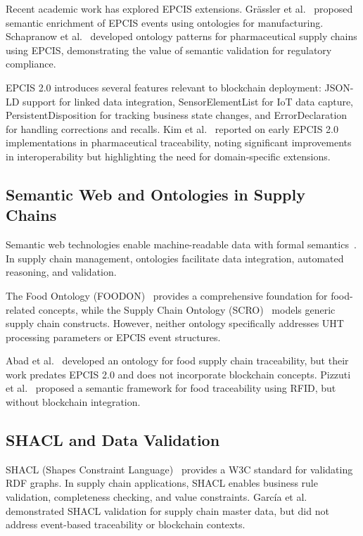 \documentclass[preprint,review,12pt,authoryear]{elsarticle}
\begin{document}
Recent academic work has explored EPCIS extensions. Gr\"assler et al.~\cite{grassler2021semantic} proposed semantic enrichment of EPCIS events using ontologies for manufacturing. Schapranow et al.~\cite{schapranow2020ontology} developed ontology patterns for pharmaceutical supply chains using EPCIS, demonstrating the value of semantic validation for regulatory compliance.

EPCIS 2.0 introduces several features relevant to blockchain deployment: JSON-LD support for linked data integration, SensorElementList for IoT data capture, PersistentDisposition for tracking business state changes, and ErrorDeclaration for handling corrections and recalls. Kim et al.~\cite{kim2023epcis} reported on early EPCIS 2.0 implementations in pharmaceutical traceability, noting significant improvements in interoperability but highlighting the need for domain-specific extensions.

\subsection{Semantic Web and Ontologies in Supply Chains}

Semantic web technologies enable machine-readable data with formal semantics~\cite{berners2001semantic}. In supply chain management, ontologies facilitate data integration, automated reasoning, and validation.

The Food Ontology (FOODON)~\cite{griffiths2018foodon} provides a comprehensive foundation for food-related concepts, while the Supply Chain Ontology (SCRO)~\cite{iof2023supply} models generic supply chain constructs. However, neither ontology specifically addresses UHT processing parameters or EPCIS event structures.

Abad et al.~\cite{abad2020ontology} developed an ontology for food supply chain traceability, but their work predates EPCIS 2.0 and does not incorporate blockchain concepts. Pizzuti et al.~\cite{pizzuti2015food} proposed a semantic framework for food traceability using RFID, but without blockchain integration.

\subsection{SHACL and Data Validation}

SHACL (Shapes Constraint Language)~\cite{knublauch2017shapes} provides a W3C standard for validating RDF graphs. In supply chain applications, SHACL enables business rule validation, completeness checking, and value constraints. Garc\'{i}a et al.~\cite{garcia2022shacl} demonstrated SHACL validation for supply chain master data, but did not address event-based traceability or blockchain contexts.
\end{document}
